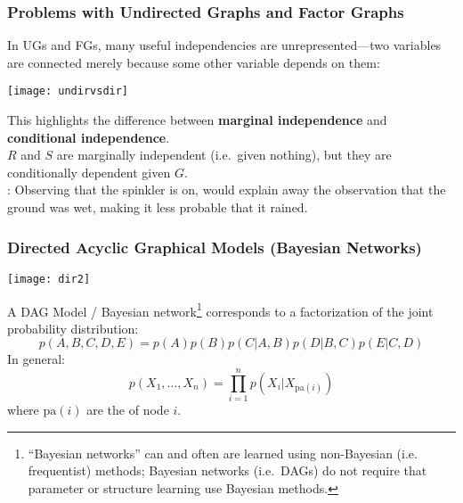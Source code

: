 \begin{frame}
\frametitle{Problems with Undirected Graphs and Factor Graphs}

In UGs and FGs, many useful independencies are unrepresented---two
variables are  connected merely because some other variable depends on them:

\vspace*{4mm}
\centerline{\texttt{[image: undirvsdir]}}
\vspace*{4mm}

This highlights the difference between {\bf marginal independence} and
{\bf conditional independence}.\\ 

$R$ and $S$ are marginally independent (i.e.\ given nothing), but they
are conditionally dependent given $G$.\\

: Observing that the spinkler is on, would
explain away the observation that the ground was wet, making it less
probable that it rained. 
 

\end{frame}
\begin{frame}
\frametitle{Directed Acyclic Graphical Models (Bayesian Networks)}

\vspace{1em}
\centerline{\texttt{[image: dir2]}}

A DAG Model / Bayesian network\footnote{``Bayesian networks'' can and
  often are learned using non-Bayesian (i.e. frequentist) methods;
  Bayesian networks (i.e.\ DAGs) do not require that parameter or structure
  learning use Bayesian methods.} corresponds to a factorization of the joint
probability distribution:
\[
p(A,B,C,D,E) = p(A) p(B) p(C|A,B) p(D|B,C) p(E|C,D)
\]
In general: \vspace*{-1em}
\[
p(X_1, \ldots, X_n) = \prod_{i=1}^n p(X_i|X_{{\mbox{pa}(i)}})
\]
where $\mbox{pa}(i)$ are the  of node $i$.

\end{frame}
